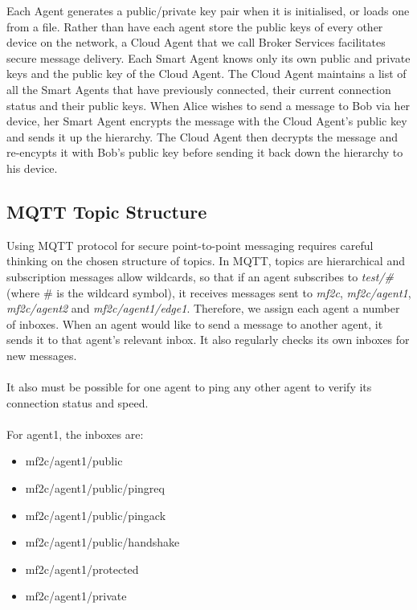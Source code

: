 Each Agent generates a public/private key pair when it is initialised, or loads one from a file. Rather than have each agent store the public keys of every other device on the network, a Cloud Agent that we call Broker Services facilitates secure message delivery. Each Smart Agent knows only its own public and private keys and the public key of the Cloud Agent. The Cloud Agent maintains a list of all the Smart Agents that have previously connected, their current connection status and their public keys. When Alice wishes to send a message to Bob via her device, her Smart Agent encrypts the message with the Cloud Agent's public key and sends it up the hierarchy. The Cloud Agent then decrypts the message and re-encypts it with Bob's public key before sending it back down the hierarchy to his device.  



\subsection{MQTT Topic Structure}


Using MQTT protocol for secure point-to-point messaging requires careful thinking on the chosen structure of topics. In MQTT, topics are hierarchical and subscription messages allow wildcards, so that if an agent subscribes to \textit{test/\#} (where \# is the wildcard symbol), it receives messages sent to \textit{mf2c}, \textit{mf2c/agent1}, \textit{mf2c/agent2} and \textit{mf2c/agent1/edge1}. Therefore, we assign each agent a number of inboxes. When an agent would like to send a message to another agent, it sends it to that agent's relevant inbox. It also regularly checks its own inboxes for new messages.

\paragraph{}
It also must be possible for one agent to ping any other agent to verify its connection status and speed.

\paragraph{}
For agent1, the inboxes are:
\begin{itemize}
    \item mf2c/agent1/public
    \item mf2c/agent1/public/pingreq
    \item mf2c/agent1/public/pingack
    \item mf2c/agent1/public/handshake
    \item mf2c/agent1/protected
    \item mf2c/agent1/private
\end{itemize}

